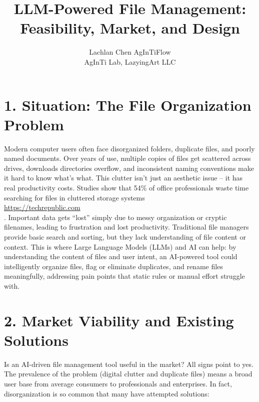 \documentclass[11pt]{article}
\title{LLM-Powered File Management: Feasibility, Market, and Design}
\author{\begin{tabular}{c}Lachlan Chen \quad AgInTiFlow\\AgInTi Lab, LazyingArt LLC\end{tabular}}
\date{}
\begin{document}
\maketitle

\section{1. Situation: The File Organization Problem}
Modern computer users often face disorganized folders, duplicate files, and poorly named documents. Over years of use, multiple copies of files get scattered across drives, downloads directories overflow, and inconsistent naming conventions make it hard to know what’s what. This clutter isn’t just an aesthetic issue -- it has real productivity costs. Studies show that 54\% of office professionals waste time searching for files in cluttered storage systems \\ \url{https://techrepublic.com} \\ . Important data gets “lost” simply due to messy organization or cryptic filenames, leading to frustration and lost productivity. Traditional file managers provide basic search and sorting, but they lack understanding of file content or context. This is where Large Language Models (LLMs) and AI can help: by understanding the content of files and user intent, an AI-powered tool could intelligently organize files, flag or eliminate duplicates, and rename files meaningfully, addressing pain points that static rules or manual effort struggle with.

\section{2. Market Viability and Existing Solutions}
Is an AI-driven file management tool useful in the market? All signs point to yes. The prevalence of the problem (digital clutter and duplicate files) means a broad user base from average consumers to professionals and enterprises. In fact, disorganization is so common that many have attempted solutions:
\end{document}
